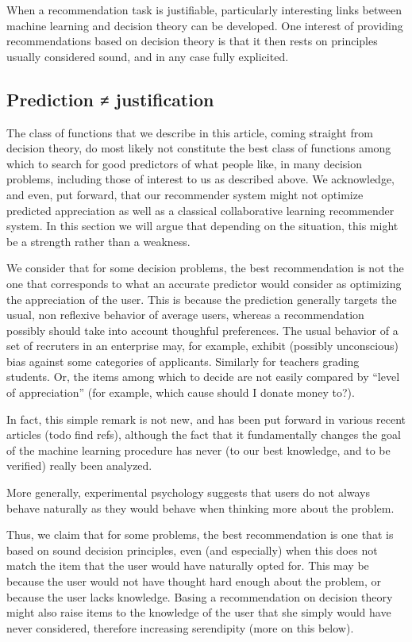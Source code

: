 \documentclass[version=last, pagesize, twoside=off, bibliography=totoc, DIV=calc, fontsize=14pt, a4paper, french, english]{scrartcl}
\begin{document}
When a recommendation task is justifiable, particularly interesting links between machine learning and decision theory can be developed. 
One interest of providing recommendations based on decision theory is that it then rests on principles usually considered sound, and in any case fully explicited.

\subsection{Prediction ≠ justification}
The class of functions that we describe in this article, coming straight from decision theory, do most likely not constitute the best class of functions among which to search for good predictors of what people like, in many decision problems, including those of interest to us as described above. We acknowledge, and even, put forward, that our recommender system might not optimize predicted appreciation as well as a classical collaborative learning recommender system.
In this section we will argue that depending on the situation, this might be a strength rather than a weakness.

We consider that for some decision problems, the best recommendation is not the one that corresponds to what an accurate predictor would consider as optimizing the appreciation of the user. This is because the prediction generally targets the usual, non reflexive behavior of average users, whereas a recommendation possibly should take into account thoughful preferences. The usual behavior of a set of recruters in an enterprise may, for example, exhibit (possibly unconscious) bias against some categories of applicants. Similarly for teachers grading students. Or, the items among which to decide are not easily compared by “level of appreciation” (for example, which cause should I donate money to?).

In fact, this simple remark is not new, and has been put forward in various recent articles (todo find refs), although the fact that it fundamentally changes the goal of the machine learning procedure has never (to our best knowledge, and to be verified) really been analyzed.

More generally, experimental psychology suggests that users do not always behave naturally as they would behave when thinking more about the problem.

Thus, we claim that for some problems, the best recommendation is one that is based on sound decision principles, even (and especially) when this does not match the item that the user would have naturally opted for. This may be because the user would not have thought hard enough about the problem, or because the user lacks knowledge. Basing a recommendation on decision theory might also raise items to the knowledge of the user that she simply would have never considered, therefore increasing serendipity (more on this below).
\end{document}
